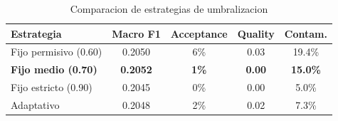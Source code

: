 
\begin{table}[h]
\centering
\caption{Comparacion de estrategias de umbralizacion}
\label{tab:adaptive_validation}
\begin{tabular}{lcccc}
\hline
Estrategia & Macro F1 & Acceptance & Quality & Contam. \\
\hline
Fijo permisivo (0.60) & 0.2050 & 6\% & 0.03 & 19.4\% \\
\textbf{Fijo medio (0.70)} & \textbf{0.2052} & \textbf{1\%} & \textbf{0.00} & \textbf{15.0\%} \\
Fijo estricto (0.90) & 0.2045 & 0\% & 0.00 & 5.0\% \\
Adaptativo & 0.2048 & 2\% & 0.02 & 7.3\% \\

\hline
\end{tabular}
\end{table}
